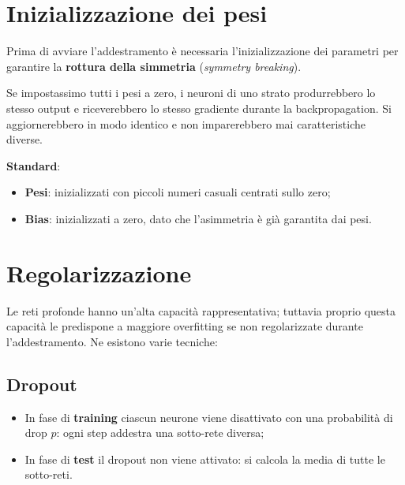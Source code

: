 \documentclass[11pt,a4paper]{article}
\begin{document}
\section{Inizializzazione dei pesi}

Prima di avviare l'addestramento è necessaria l'inizializzazione dei parametri per garantire la \textbf{rottura della simmetria} (\emph{symmetry breaking}).

Se impostassimo tutti i pesi a zero, i neuroni di uno strato produrrebbero lo stesso output e riceverebbero lo stesso gradiente durante la backpropagation. Si aggiornerebbero in modo identico e non imparerebbero mai caratteristiche diverse.

\textbf{Standard}:
\begin{itemize}
  \item \textbf{Pesi}: inizializzati con piccoli numeri casuali centrati sullo zero;
  \item \textbf{Bias}: inizializzati a zero, dato che l'asimmetria è già garantita dai pesi.
\end{itemize}

\section{Regolarizzazione}

Le reti profonde hanno un'alta capacità rappresentativa; tuttavia proprio questa capacità le predispone a maggiore overfitting se non regolarizzate durante l'addestramento. Ne esistono varie tecniche:

\subsection{Dropout}
\begin{itemize}
  \item In fase di \textbf{training} ciascun neurone viene disattivato con una probabilità di drop $p$: ogni step addestra una sotto-rete diversa;
  \item In fase di \textbf{test} il dropout non viene attivato: si calcola la media di tutte le sotto-reti.
\end{itemize}
\end{document}
